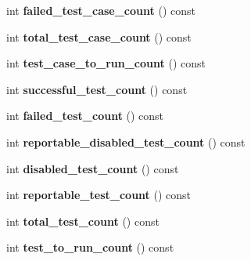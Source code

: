 \begin{DoxyCompactItemize}
\item 
\hypertarget{classtesting_1_1UnitTest_a1084a93a4b92c6506738e309b0a9eeea}{int {\bfseries failed\-\_\-test\-\_\-case\-\_\-count} () const }\label{classtesting_1_1UnitTest_a1084a93a4b92c6506738e309b0a9eeea}

\item 
\hypertarget{classtesting_1_1UnitTest_a6802793a0be9cee17380fdd8c7161fcd}{int {\bfseries total\-\_\-test\-\_\-case\-\_\-count} () const }\label{classtesting_1_1UnitTest_a6802793a0be9cee17380fdd8c7161fcd}

\item 
\hypertarget{classtesting_1_1UnitTest_abb7330165eb5be7beac3f7e6ced5fcdd}{int {\bfseries test\-\_\-case\-\_\-to\-\_\-run\-\_\-count} () const }\label{classtesting_1_1UnitTest_abb7330165eb5be7beac3f7e6ced5fcdd}

\item 
\hypertarget{classtesting_1_1UnitTest_a4795d58351f03498d5823a743b0722c5}{int {\bfseries successful\-\_\-test\-\_\-count} () const }\label{classtesting_1_1UnitTest_a4795d58351f03498d5823a743b0722c5}

\item 
\hypertarget{classtesting_1_1UnitTest_aeda0f8ca87adf65f634c3d6d9ab98598}{int {\bfseries failed\-\_\-test\-\_\-count} () const }\label{classtesting_1_1UnitTest_aeda0f8ca87adf65f634c3d6d9ab98598}

\item 
\hypertarget{classtesting_1_1UnitTest_aa5eaf98c5d9cc0afe501ac03e6414188}{int {\bfseries reportable\-\_\-disabled\-\_\-test\-\_\-count} () const }\label{classtesting_1_1UnitTest_aa5eaf98c5d9cc0afe501ac03e6414188}

\item 
\hypertarget{classtesting_1_1UnitTest_a4cbd084447b74784d1bb85c1ed4b96d5}{int {\bfseries disabled\-\_\-test\-\_\-count} () const }\label{classtesting_1_1UnitTest_a4cbd084447b74784d1bb85c1ed4b96d5}

\item 
\hypertarget{classtesting_1_1UnitTest_aa32cb4f3cd34564a5c641bd409f8f83b}{int {\bfseries reportable\-\_\-test\-\_\-count} () const }\label{classtesting_1_1UnitTest_aa32cb4f3cd34564a5c641bd409f8f83b}

\item 
\hypertarget{classtesting_1_1UnitTest_a54315b233d354693b9aa1184cf2996de}{int {\bfseries total\-\_\-test\-\_\-count} () const }\label{classtesting_1_1UnitTest_a54315b233d354693b9aa1184cf2996de}

\item 
\hypertarget{classtesting_1_1UnitTest_a953a52f89898a04ee4a4e08469407cd3}{int {\bfseries test\-\_\-to\-\_\-run\-\_\-count} () const }\label{classtesting_1_1UnitTest_a953a52f89898a04ee4a4e08469407cd3}


\end{DoxyCompactItemize}
